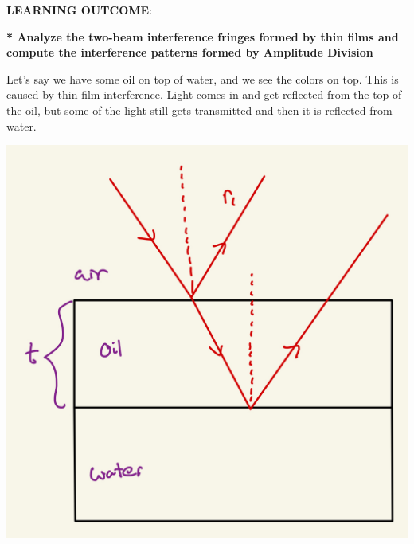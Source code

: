 \documentclass[10pt]{article}
\newcommand*{\lo}[1]{
    \textbf{* #1} \newline
}
\begin{document}
\newblock

\textbf{LEARNING OUTCOME}:


\newpage

\lo{Analyze the two-beam interference
fringes formed by thin films and compute the interference
patterns formed by Amplitude Division}

Let's say we have some oil on top of water, and we see the colors on top. This is caused by thin film interference. Light comes in and get reflected from the top of the oil, but some of the light still gets transmitted and then it is reflected from water.

\begin{center}
    \includegraphics*[scale = .2]{imgs/thin-film-1.jpeg}
\end{center}
\end{document}
